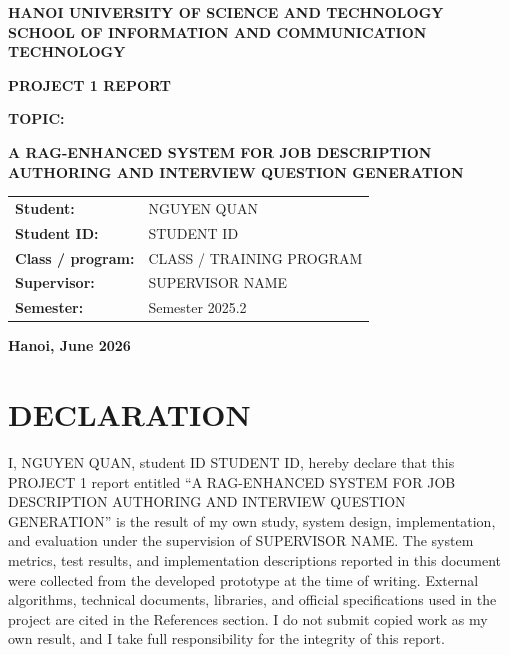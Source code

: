 \documentclass[12pt,a4paper,oneside]{report}
\newcommand{\University}{HANOI UNIVERSITY OF SCIENCE AND TECHNOLOGY}
\newcommand{\School}{SCHOOL OF INFORMATION AND COMMUNICATION TECHNOLOGY}
\newcommand{\CourseName}{PROJECT 1}
\newcommand{\ReportTitle}{A RAG-ENHANCED SYSTEM FOR JOB DESCRIPTION AUTHORING AND INTERVIEW QUESTION GENERATION}
\newcommand{\StudentName}{NGUYEN QUAN}
\newcommand{\StudentID}{STUDENT ID}
\newcommand{\ClassName}{CLASS / TRAINING PROGRAM}
\newcommand{\Supervisor}{SUPERVISOR NAME}
\newcommand{\Semester}{Semester 2025.2}
\newcommand{\PlaceAndDate}{Hanoi, June 2026}
\begin{document}
\begin{titlepage}
\begin{center}
{\bfseries\large \University\\[0.25cm] \School}\par
\vspace{1.1cm}
\vspace{0.8cm}

{\bfseries\LARGE \CourseName{} REPORT}\par
\vspace{1.0cm}
{\bfseries\large TOPIC:}\par
\vspace{0.35cm}
\begin{minipage}{0.92\textwidth}
\centering
{\bfseries\Large\color{HustRed} \ReportTitle}
\end{minipage}
\vfill

\begin{tabular}{>{\bfseries}p{4.8cm}p{9.2cm}}
Student: & \StudentName\\[0.25cm]
Student ID: & \StudentID\\[0.25cm]
Class / program: & \ClassName\\[0.25cm]
Supervisor: & \Supervisor\\[0.25cm]
Semester: & \Semester
\end{tabular}
\vfill
{\bfseries \PlaceAndDate}
\end{center}
\end{titlepage}


\chapter*{DECLARATION}
I, \StudentName, student ID \StudentID, hereby declare that this \CourseName{} report entitled ``\ReportTitle'' is the result of my own study, system design, implementation, and evaluation under the supervision of \Supervisor. The system metrics, test results, and implementation descriptions reported in this document were collected from the developed prototype at the time of writing. External algorithms, technical documents, libraries, and official specifications used in the project are cited in the References section. I do not submit copied work as my own result, and I take full responsibility for the integrity of this report.
\end{document}

